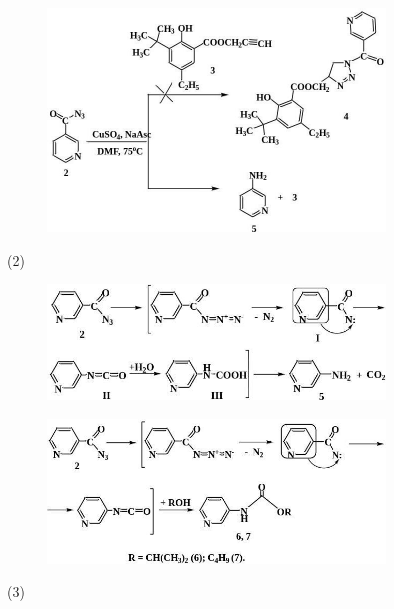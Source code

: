 \begin{figure}[H]
	\centering
	\includegraphics[width=0.8\textwidth]{assets/3}
	\caption*{}
\end{figure} (2)

\begin{figure}[H]
	\centering
	\includegraphics[width=0.8\textwidth]{assets/4}
	\caption*{}
\end{figure} \begin{figure}[H]
	\centering
	\includegraphics[width=0.8\textwidth]{assets/5}
	\caption*{}
\end{figure}
(3)

